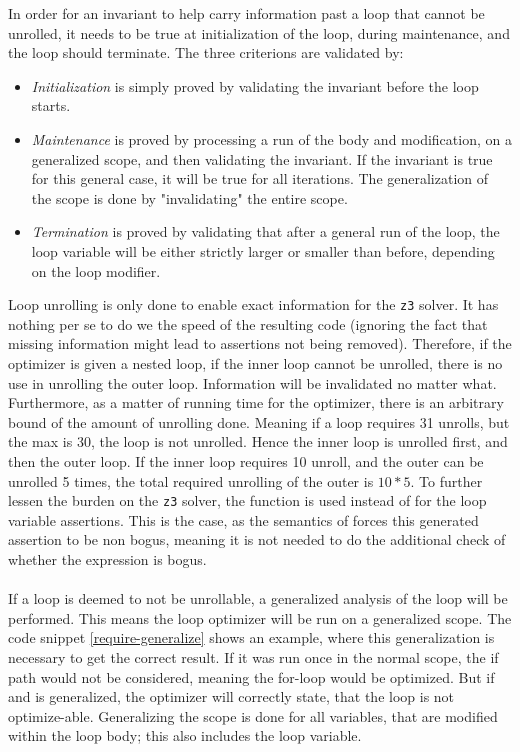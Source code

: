 In order for an invariant to help carry information past a loop that cannot be unrolled, it needs
to be true at initialization of the loop, during maintenance, and the loop should terminate.
The three criterions are validated by:
\begin{itemize}
    \item \emph{Initialization} is simply proved by validating the invariant before the loop starts.

    \item \emph{Maintenance} is proved by processing a run of the body and modification, on a
          generalized scope, and then validating the invariant. If the invariant is true for this
          general case, it will be true for all iterations. The generalization of the scope is
          done by "invalidating" the entire scope.

    \item \emph{Termination} is proved by validating that after a general run of the loop,
          the loop variable will be either strictly larger or smaller than before, depending
          on the loop modifier.
\end{itemize}
\noindent
Loop unrolling is only done to enable exact information for the \texttt{z3} solver. It has nothing
per se to do we the speed of the resulting code (ignoring the fact that missing information
might lead to assertions not being removed). Therefore, if the optimizer is given a nested loop,
if the inner loop cannot be unrolled, there is no use in unrolling the outer loop. Information will
be invalidated no matter what. Furthermore, as a matter of running time for the optimizer, there
is an arbitrary bound of the amount of unrolling done. Meaning if a loop requires 31 unrolls, but
the max is 30, the loop is not unrolled. Hence the inner loop is unrolled first, and then the outer
loop. If the inner loop requires 10 unroll, and the outer can be unrolled 5 times, the total
required unrolling of the outer is $10*5$. To further lessen the burden on the \texttt{z3}
solver, the function  is used instead of  for the loop
variable assertions. This is the case, as the semantics of \lan forces this generated assertion
to be non bogus, meaning it is not needed to do the additional check of whether the expression
is bogus.
\\
\\
If a loop is deemed to not be unrollable, a generalized analysis of the loop will be performed.
This means the loop optimizer will be run on a generalized scope. The code snippet
\ref{require-generalize} shows an example, where this generalization is necessary to get the
correct result. If it was run once in the normal scope, the if path would not be considered,
meaning the for-loop would be optimized. But if  and  is generalized, the
optimizer will correctly state, that the loop is not optimize-able.
Generalizing the scope is done for all variables, that are modified within the loop body;
this also includes the loop variable.

